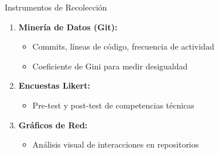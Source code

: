 \documentclass[t]{beamer}
\begin{document}
\begin{frame}{Instrumentos de Recolección}
    \begin{enumerate}
        \item \textbf{Minería de Datos (Git):}
        \begin{itemize}
            \item Commits, líneas de código, frecuencia de actividad
            \item Coeficiente de Gini para medir desigualdad
        \end{itemize}
        
        \vspace{0.2cm}
        
        \item \textbf{Encuestas Likert:}
        \begin{itemize}
            \item Pre-test y post-test de competencias técnicas
        \end{itemize}
        
        \vspace{0.2cm}
        
        \item \textbf{Gráficos de Red:}
        \begin{itemize}
            \item Análisis visual de interacciones en repositorios
        \end{itemize}
    \end{enumerate}
\end{frame}
\end{document}
